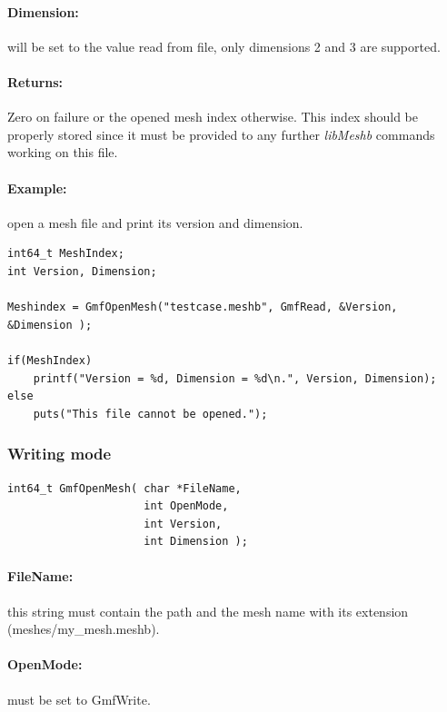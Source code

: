 \documentclass[a4paper,12pt]{article}
\begin{document}
\paragraph{Dimension:}
will be set to the value read from file, only dimensions 2 and 3 are supported.

\paragraph{Returns:}
Zero on failure or the opened mesh index otherwise. This index should be properly stored since it must be provided to any further \emph{libMeshb} commands working on this file.

\paragraph{Example:} open a mesh file and print its version and dimension.

\begin{tt}
\begin{verbatim}
int64_t MeshIndex;
int Version, Dimension;

Meshindex = GmfOpenMesh("testcase.meshb", GmfRead, &Version, &Dimension );

if(MeshIndex)
    printf("Version = %d, Dimension = %d\n.", Version, Dimension);
else
    puts("This file cannot be opened.");
\end{verbatim}
\end{tt}
\normalfont


\subsubsection{Writing mode}
\begin{tt}
\begin{verbatim}
int64_t GmfOpenMesh( char *FileName,
                     int OpenMode,
                     int Version,
                     int Dimension );
\end{verbatim}
\end{tt}
\normalfont

\paragraph{FileName:}
this string must contain the path and the mesh name with its extension (meshes/my\_mesh.meshb).

\paragraph{OpenMode:}
must be set to GmfWrite.
\end{document}
